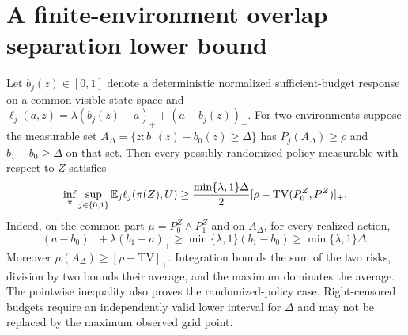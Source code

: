 \section{A finite-environment overlap--separation lower bound}
Let $b_j(z)\in[0,1]$ denote a deterministic normalized sufficient-budget
response on a common visible state space and
$\ell_j(a,z)=\lambda(b_j(z)-a)_+ +(a-b_j(z))_+$.
For two environments suppose the measurable set
$A_\Delta=\{z:b_1(z)-b_0(z)\ge\Delta\}$ has
$P_j(A_\Delta)\ge\rho$ and $b_1-b_0\ge\Delta$ on that set. Then every
possibly randomized policy measurable with respect to $Z$ satisfies
\[
 \inf_\pi\sup_{j\in\{0,1\}}\mathbb E_j\ell_j(\pi(Z),U)
 \ge {\min\{\lambda,1\}\Delta\over2}
       [\rho-\operatorname{TV}(P_0^Z,P_1^Z)]_+ .
\]
Indeed, on the common part $\mu=P_0^Z\wedge P_1^Z$ and on
$A_\Delta$, for every realized action,
\[
 (a-b_0)_++\lambda(b_1-a)_+
 \ge \min\{\lambda,1\}(b_1-b_0)
 \ge \min\{\lambda,1\}\Delta.
\]
Moreover $\mu(A_\Delta)\ge[\rho-\mathrm{TV}]_+$. Integration bounds
the sum of the two risks, division by two bounds their average, and the
maximum dominates the average. The pointwise inequality also proves the
randomized-policy case. Right-censored budgets require an independently
valid lower interval for $\Delta$ and may not be replaced by the maximum
observed grid point.
